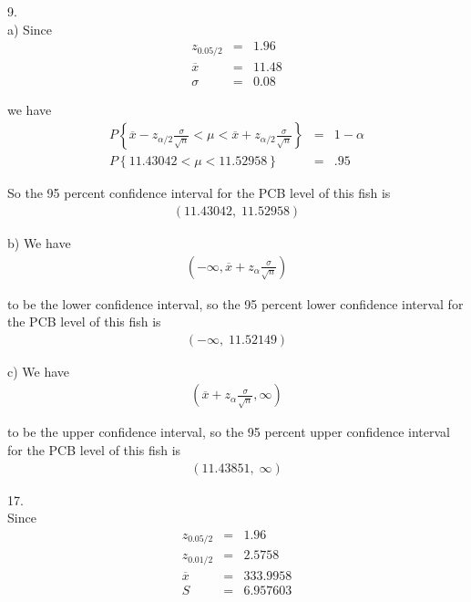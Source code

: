 \documentclass[12pt]{article}
\begin{document}
9. \\

a) Since
\begin{eqnarray*}
  z_{0.05/2} &=& 1.96 \\
  \overline{x} &=& 11.48 \\
  \sigma &=& 0.08
\end{eqnarray*}

we have
\begin{eqnarray*}
  P \left\{ \overline{x} - z_{\alpha / 2} \frac {\sigma}{\sqrt{n}} < \mu
    < \overline{x} + z_{\alpha / 2} \frac {\sigma}{\sqrt{n}}
  \right\} &=& 1 - \alpha \\
  P \left\{ 11.43042 < \mu < 11.52958 \right\} &=& .95
\end{eqnarray*}

So the 95 percent confidence interval for the PCB level of this fish is
\begin{eqnarray*}
  \left( 11.43042, \; 11.52958 \right)
\end{eqnarray*}

b) We have
\begin{eqnarray*}
    \left( -\infty, \overline{x} + z_{\alpha} \frac {\sigma}{\sqrt{n}} \right)
\end{eqnarray*}

to be the lower confidence interval, so the 95 percent lower confidence interval for the PCB level of this fish is
\begin{eqnarray*}
  \left( - \infty, \; 11.52149 \right)
\end{eqnarray*}

c) We have
\begin{eqnarray*}
    \left( \overline{x} + z_{\alpha} \frac {\sigma}{\sqrt{n}}, \infty \right)
\end{eqnarray*}

to be the upper confidence interval, so the 95 percent upper confidence interval for the PCB level of this fish is
\begin{eqnarray*}
  \left( 11.43851, \; \infty \right)
\end{eqnarray*}

17. \\

Since
\begin{eqnarray*}
  z_{0.05/2} &=& 1.96 \\
  z_{0.01/2} &=& 2.5758 \\
  \overline{x} &=& 333.9958 \\
  S &=& 6.957603
\end{eqnarray*}
\end{document}
